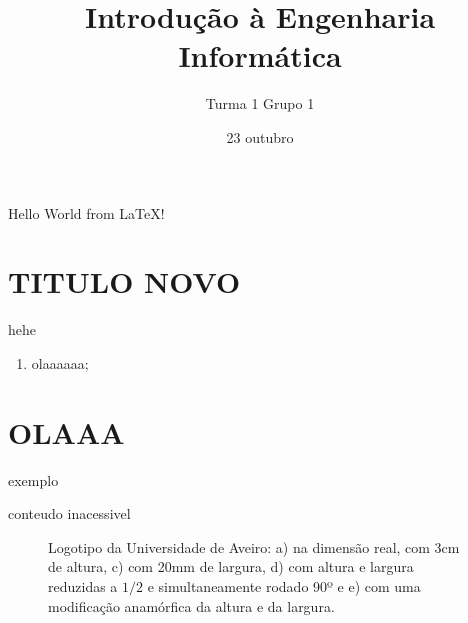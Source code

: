 \documentclass[11pt,openright,twoside]{report}
\title{\textbf{Introdução à Engenharia Informática}}
\author{Turma 1 Grupo 1}
\date{}
\begin{document}
\maketitle
Hello World from \LaTeX!


\date{23 outubro}

\chapter{TITULO NOVO}
\tableofcontents
hehe
\begin{figure}[h]
    \centerline{\fbox}

\end{figure}
\begin{enumerate}
    \item olaaaaaa;
\end{enumerate}    

\cite{Lamport.94}





\chapter{OLAAA}

\begin{table}[t]
\caption{exemplo}
    \centerline{conteudo inacessivel}
\label{exemplo}
\end{table}



\begin{figure}[h]
    \center %
    
    \caption{Logotipo da Universidade de Aveiro: a) na dimensão real,
     com 3cm de altura, c) com 20mm de largura, d) com altura e largura
    reduzidas a $1/2$ e simultaneamente rodado 90º e e) com uma modificação
    anamórfica da altura e da largura.}
    \label{fig:images}
\end{figure}



\end{document}
